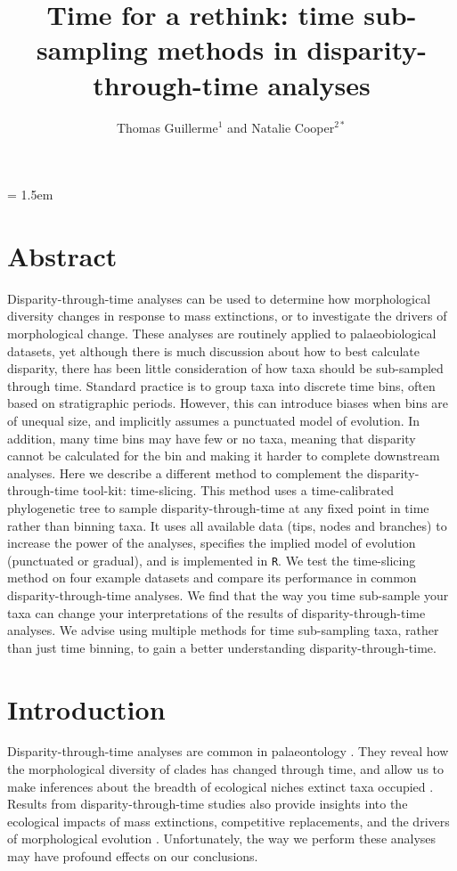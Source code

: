 \documentclass[12pt,a4paper]{article}
\title{Time for a rethink: time sub-sampling methods in disparity-through-time analyses}
\author{
	Thomas Guillerme$^{1}$ and Natalie Cooper$^{2*}$
}
\date{}
\affiliation{\noindent{\footnotesize
	$^1$School of Biological Sciences, University of Queensland, St. Lucia, Queensland, Australia.\\
	$^2$Department of Life Sciences, Natural History Museum, Cromwell Road, London, SW7 5BD, UK. natalie.cooper@nhm.ac.uk}\\
	$^*$Corresponding author\\}
\begin{document}
\mstitlepage
\parindent = 1.5em
\addtolength{\parskip}{.3em}

\section{Abstract}

Disparity-through-time analyses can be used to determine how morphological diversity changes in response to mass extinctions, or to investigate the drivers of morphological change.
These analyses are routinely applied to palaeobiological datasets, yet although there is much discussion about how to best calculate disparity, there has been little consideration of how taxa should be sub-sampled through time.
Standard practice is to group taxa into discrete time bins, often based on stratigraphic periods. 
However, this can introduce biases when bins are of unequal size, and implicitly assumes a punctuated model of evolution. 
In addition, many time bins may have few or no taxa, meaning that disparity cannot be calculated for the bin and making it harder to complete downstream analyses.
Here we describe a different method to complement the disparity-through-time tool-kit: time-slicing.
This method uses a time-calibrated phylogenetic tree to sample disparity-through-time at any fixed point in time rather than binning taxa.
It uses all available data (tips, nodes and branches) to increase the power of the analyses, specifies the implied model of evolution (punctuated or gradual), and is implemented in \texttt{R}.
We test the time-slicing method on four example datasets and compare its performance in common disparity-through-time analyses.
We find that the way you time sub-sample your taxa can change your interpretations of the results of disparity-through-time analyses.
We advise using multiple methods for time sub-sampling taxa, rather than just time binning, to gain a better understanding disparity-through-time.

\newpage
\raggedright
\doublespacing
\setlength{\parindent}{1cm}

\section{Introduction}
Disparity-through-time analyses are common in palaeontology \citep{gould1991disparity,briggs1992morphological,Wills1994,Foote01071994}.
They reveal how the morphological diversity of clades has changed through time, and allow us to make inferences about the breadth of ecological niches extinct taxa occupied \citep{foote1997evolution}.
Results from disparity-through-time studies also provide insights into the ecological impacts of mass extinctions, competitive replacements, and the drivers of morphological evolution \citep{Brusatte12092008,Foote29111996,friedmanexplosive2010}.
Unfortunately, the way we perform these analyses may have profound effects on our conclusions.
\end{document}
